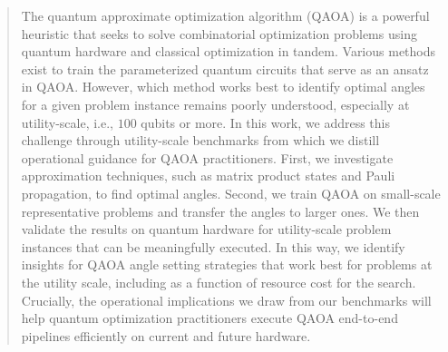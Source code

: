 \documentclass[twocolumn,
english,
aps,
pra,
10pt,
longbibliography,
superscriptaddress,
amsmath,
amssymb,
floatfix
]{revtex4-2}
\begin{document}
\author{J. A. Monta\~nez-Barrera}

  \author{Jakub Marecek}
  
\author{Davide Venturelli}

\author{Stephan Eidenbenz}

\author{David E. Bernal Neira}

\author{Daniel J. Egger}


\begin{abstract}
The quantum approximate optimization algorithm (QAOA) is a powerful heuristic that seeks to solve combinatorial optimization problems using quantum hardware and classical optimization in tandem. 
Various methods exist to train the parameterized quantum circuits that serve as an ansatz in QAOA. 
However, which method works best to identify optimal angles for a given problem instance remains poorly understood, especially at utility-scale, i.e., $100$ qubits or more.
In this work, we address this challenge through utility-scale benchmarks from which we distill operational guidance for QAOA practitioners. 
First, we investigate approximation techniques, such as matrix product states and Pauli propagation, to find optimal angles.
Second, we train QAOA on small-scale representative problems and transfer the angles to larger ones. 
We then validate the results on quantum hardware for utility-scale problem instances that can be meaningfully executed. 
In this way, we identify insights for QAOA angle setting strategies that work best for problems at the utility scale, including as a function of resource cost for the search.
Crucially, the operational implications we draw from our benchmarks will help quantum optimization practitioners execute QAOA end-to-end pipelines efficiently on current and future hardware.
\end{abstract}

\maketitle
\end{document}
